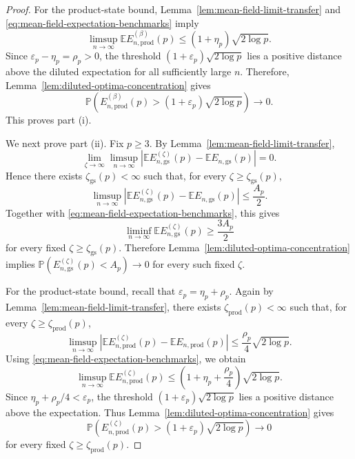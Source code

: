 \documentclass[12pt]{article}
\newcommand{\E}{\mathbb{E}}
\renewcommand{\P}{\mathbb{P}}
\begin{document}
\begin{appendix}
\begin{proof}
For the product-state bound,
Lemma~\ref{lem:mean-field-limit-transfer} and
\eqref{eq:mean-field-expectation-benchmarks} imply
\[
    \limsup_{n\to\infty}
    \E E_{n,\mathrm{prod}}^{(\beta)}(p)
    \le
    (1+\eta_p)\sqrt{2\log p}.
\]
Since \(\varepsilon_p-\eta_p=\rho_p>0\), the threshold
\((1+\varepsilon_p)\sqrt{2\log p}\) lies a positive distance above the
diluted expectation for all sufficiently large \(n\). Therefore,
Lemma~\ref{lem:diluted-optima-concentration} gives
\[
    \P(
        E_{n,\mathrm{prod}}^{(\beta)}(p)
        >
        (1+\varepsilon_p)\sqrt{2\log p}
    )
    \to0.
\]
This proves part \textup{(i)}.

We next prove part \textup{(ii)}. Fix \(p\ge3\). By
Lemma~\ref{lem:mean-field-limit-transfer},
\[
    \lim_{\zeta\to\infty}
    \limsup_{n\to\infty}
    |
        \E E_{n,\mathrm{gs}}^{(\zeta)}(p)
        -
        \E E_{n,\mathrm{gs}}(p)
    |
    =0.
\]
Hence there exists
\(\zeta_{\mathrm{gs}}(p)<\infty\) such that, for every
\(\zeta\ge\zeta_{\mathrm{gs}}(p)\),
\[
    \limsup_{n\to\infty}
    |
        \E E_{n,\mathrm{gs}}^{(\zeta)}(p)
        -
        \E E_{n,\mathrm{gs}}(p)
    |
    \le
    \frac{A_p}{2}.
\]
Together with \eqref{eq:mean-field-expectation-benchmarks}, this gives
\[
    \liminf_{n\to\infty}
    \E E_{n,\mathrm{gs}}^{(\zeta)}(p)
    \ge
    \frac{3A_p}{2}
\]
for every fixed \(\zeta\ge\zeta_{\mathrm{gs}}(p)\). Therefore
Lemma~\ref{lem:diluted-optima-concentration} implies $\P\left(
        E_{n,\mathrm{gs}}^{(\zeta)}(p)
        <
        A_p
    \right)
    \to0$ for every such fixed \(\zeta\).

For the product-state bound, recall that \(\varepsilon_p=\eta_p+\rho_p\).
Again by Lemma~\ref{lem:mean-field-limit-transfer}, there exists
\(\zeta_{\mathrm{prod}}(p)<\infty\) such that, for every
\(\zeta\ge\zeta_{\mathrm{prod}}(p)\),
\[
    \limsup_{n\to\infty}
    |
        \E E_{n,\mathrm{prod}}^{(\zeta)}(p)
        -
        \E E_{n,\mathrm{prod}}(p)
    |
    \le
    \frac{\rho_p}{4}\sqrt{2\log p}.
\]
Using \eqref{eq:mean-field-expectation-benchmarks}, we obtain
\[
    \limsup_{n\to\infty}
    \E E_{n,\mathrm{prod}}^{(\zeta)}(p)
    \le
    \left(
        1+\eta_p+\frac{\rho_p}{4}
    \right)
    \sqrt{2\log p}.
\]
Since $\eta_p+\rho_p/4
    <
    \varepsilon_p$, the threshold
\((1+\varepsilon_p)\sqrt{2\log p}\) lies a positive distance above the
expectation. Thus
Lemma~\ref{lem:diluted-optima-concentration} gives
\[
    \P\left(
        E_{n,\mathrm{prod}}^{(\zeta)}(p)
        >
        (1+\varepsilon_p)\sqrt{2\log p}
    \right)
    \to0
\]
for every fixed
\(\zeta\ge\zeta_{\mathrm{prod}}(p)\).


\end{proof}
\end{appendix}
\end{document}

